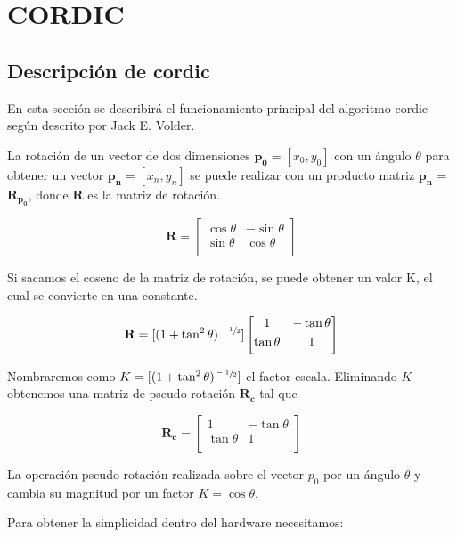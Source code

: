 \chapter{CORDIC}
\section{Descripción de \gls{cordic}}

En esta sección se describirá el funcionamiento principal del algoritmo \gls{cordic} según descrito por Jack E. Volder.

La rotación de un vector de dos dimensiones $\boldsymbol{p_{0}} = [x_{0},y_{0}]$ con un ángulo $\theta$ para obtener un vector $\boldsymbol{p_{n}} = [x_{n},y_{n}]$ se puede realizar con un producto matriz $\boldsymbol{p_{n}}$ = $\boldsymbol{R_{p_{0}}}$, donde $\textbf{R}$ es la matriz de rotación.

\[ \textbf{R} = \begin{bmatrix}
\cos{\theta} & -\sin{\theta} 	\\[0.3em]
\sin{\theta}  & \cos{\theta} 			\\[0.3em]
\end{bmatrix} \]

Si sacamos el coseno de la matriz de rotación, se puede obtener un valor K, el cual se convierte en una constante.

\[ \textbf{R} = [(1 + \tan^2{\theta})^{\sfrac{-1}{2}}] \begin{bmatrix}
1 & -\tan{\theta} 	\\[0.3em]
\tan{\theta}  & 1 			\\[0.3em]
\end{bmatrix} \]

Nombraremos como $K = [(1 + \tan^2{\theta})^{\sfrac{-1}{2}}]$ el factor escala. Eliminando $K$ obtenemos una matriz de pseudo-rotación $\boldsymbol{R_{c}}$ tal que

\[ \boldsymbol{R_{c}} = \begin{bmatrix}
1 & -\tan{\theta} 	\\[0.3em]
\tan{\theta}  & 1 			\\[0.3em]
\end{bmatrix} \]

La operación pseudo-rotación realizada sobre el vector $p_{0}$ por un ángulo $\theta$ y cambia su magnitud por un factor $K = \cos{\theta}$.

Para obtener la simplicidad dentro del hardware necesitamos:


